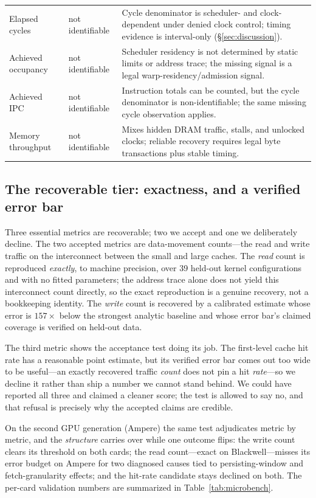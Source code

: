 \documentclass[conference]{IEEEtran}
\begin{document}
\begin{table}[t]
\begin{tabular}{@{}p{3.0cm}p{2.3cm}>{\raggedright\arraybackslash}p{11.0cm}@{}}
Elapsed cycles & not identifiable &
Cycle denominator is scheduler- and clock-dependent under denied clock
control; timing evidence is interval-only (\S\ref{sec:discussion}).\\
Achieved occupancy & not identifiable &
Scheduler residency is not determined by static limits or address trace;
the missing signal is a legal warp-residency/admission signal.\\
Achieved IPC & not identifiable &
Instruction totals can be counted, but the cycle denominator is
non-identifiable; the same missing cycle observation applies.\\
Memory throughput & not identifiable &
Mixes hidden DRAM traffic, stalls, and unlocked clocks; reliable recovery requires
legal byte transactions plus stable timing.\\
\bottomrule
\end{tabular}
\end{table}

\subsection{The recoverable tier: exactness, and a verified error bar}
Three essential metrics are recoverable; two we accept and one we
deliberately decline. The two accepted metrics are data-movement
counts---the read and write traffic on the interconnect between the small
and large caches. The \emph{read} count is reproduced \emph{exactly}, to
machine precision, over 39 held-out kernel configurations and with no
fitted parameters; the address trace alone does not yield this interconnect count
directly, so the exact reproduction is a genuine recovery, not a
bookkeeping identity. The \emph{write} count is recovered by a calibrated
estimate whose error is $157\times$ below the strongest analytic baseline
and whose error bar's claimed coverage is verified on held-out data.

The third metric shows the acceptance test doing its job. The first-level cache hit
rate has a reasonable point estimate, but its verified error bar comes out
too wide to be useful---an exactly recovered traffic \emph{count} does not
pin a hit \emph{rate}---so we decline it rather than ship a number we
cannot stand behind. We could have reported all three and claimed a cleaner
score; the test is allowed to say no, and that refusal is precisely why the
accepted claims are credible.

On the second GPU generation (Ampere) the same test adjudicates metric by
metric, and the \emph{structure} carries over while one outcome flips: the
write count clears its threshold on both cards; the read count---exact on
Blackwell---misses its error budget on Ampere for two diagnosed causes
tied to persisting-window and fetch-granularity effects; and the hit-rate candidate stays
declined on both. The per-card validation numbers are summarized in
Table~\ref{tab:microbench}.
\end{document}
